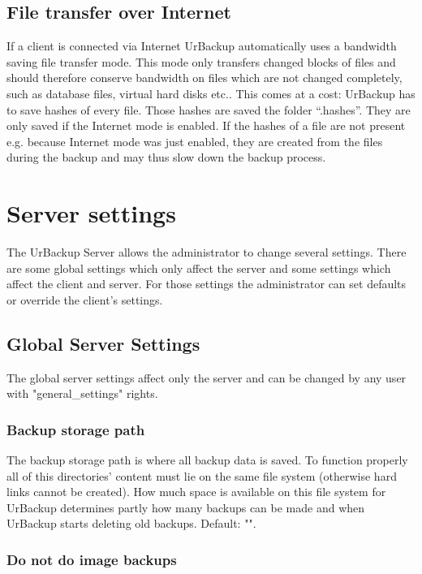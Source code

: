 \documentclass[a4paper,10pt]{article} \usepackage[breaklinks=true]{hyperref}
\begin{document}
\subsection{File transfer over Internet}

If a client is connected via Internet UrBackup automatically uses a bandwidth saving
file transfer mode. This mode only transfers changed blocks of files and should 
therefore conserve bandwidth on files which are not changed completely, such as
database files, virtual hard disks etc.. This comes at a cost: UrBackup has to save
hashes of every file. Those hashes are saved the folder ``.hashes''. They are only
saved if the Internet mode is enabled. If the hashes of a file are not present e.g.
because Internet mode was just enabled, they are created from the files during
the backup and may thus slow down the backup process. 

\section{Server settings}
\label{server_settings}

The UrBackup Server allows the administrator to change several settings. There
are some global settings which only affect the server and some settings which
affect the client and server. For those settings the administrator can set
defaults or override the client's settings.

\subsection{Global Server Settings}

The global server settings affect only the server and can be changed by any user
with "general\_settings" rights.

\subsubsection{Backup storage path}

The backup storage path is where all backup data is saved. To function properly all of this directories' content must lie on the same file system (otherwise hard links cannot be created). How much space is available on this file system for UrBackup determines partly how many backups can be made and when UrBackup starts deleting old backups. Default: "".

\subsubsection{Do not do image backups}
\end{document}
